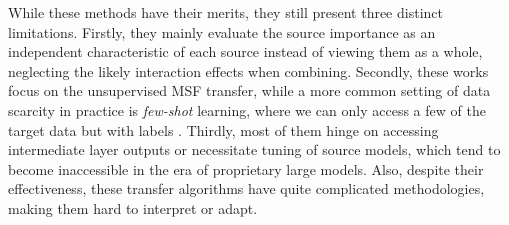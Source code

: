 \documentclass[letterpaper]{article} %
\begin{document}
While these methods have their merits, %
they still present three distinct limitations.
Firstly,
they mainly evaluate the source importance as an independent characteristic of each source instead of viewing them as a
whole,
neglecting the likely interaction effects when combining.
Secondly, these works
focus on the unsupervised MSF transfer,
while a more common setting of data scarcity in practice is \textit{few-shot} learning, where we can only access a few of the target data but with labels \citep{wang2020generalizing}. Thirdly, most of them hinge on accessing intermediate layer outputs or necessitate tuning of source models, which tend to become inaccessible in the era of proprietary large models. Also, despite their effectiveness, these transfer algorithms have quite complicated methodologies, making them hard to interpret or adapt.

\end{document}
